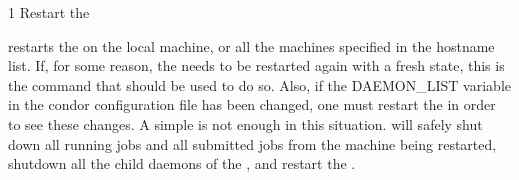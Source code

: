 \begin{ManPage}{\label{man-condor-restart}}{1}
{Restart the }
\Synopsis {}

\Description 

 restarts the  on the local machine, or all the
machines specified in the hostname list.  If, for some reason, the
 needs to be restarted again with a fresh state, this is the
command that should be used to do so.  Also, if the DAEMON\_LIST variable in
the condor configuration file has been changed, one must restart the
 in order to see these changes.  A simple 
is not enough in this situation.   will safely shut down
all running jobs and all submitted jobs from the machine being restarted,
shutdown all the child daemons of the , and restart the
.

\begin{Options}
\end{Options}

\end{ManPage}
